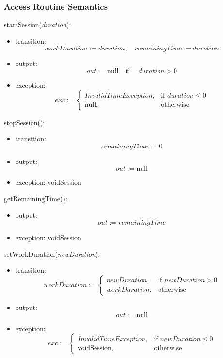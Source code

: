 \documentclass[12pt, titlepage]{article}
\begin{document}
\subsubsection{Access Routine Semantics}

\noindent startSession(\textit{duration}):
\begin{itemize}
\item transition: 
    \[
    workDuration := duration, \quad remainingTime := duration
    \]
\item output: 
    \[
    out := \text{null} \quad \text{if } \quad duration > 0
    \]
\item exception: 
    \[
    exc := \begin{cases} 
    InvalidTimeException, & \text{if } duration \leq 0 \\
    \text{null}, & \text{otherwise} 
    \end{cases}
    \]
\end{itemize}

\noindent stopSession():
\begin{itemize}
\item transition: 
    \[
    remainingTime := 0
    \]
\item output: 
    \[
    out := \text{null}
    \]
\item exception: voidSession
\end{itemize}

\noindent getRemainingTime():
\begin{itemize}
\item output: 
    \[
    out := remainingTime
    \]
\item exception: voidSession
\end{itemize}

\noindent setWorkDuration(\textit{newDuration}):
\begin{itemize}
\item transition: 
    \[
    workDuration := \begin{cases} 
    newDuration, & \text{if } newDuration > 0 \\
    workDuration, & \text{otherwise}
    \end{cases}
    \]
\item output: 
    \[
    out := \text{null}
    \]
\item exception: 
    \[
    exc := \begin{cases} 
    InvalidTimeException, & \text{if } newDuration \leq 0 \\
    \text{voidSession}, & \text{otherwise} 
    \end{cases}
    \]
\end{itemize}
\end{document}

